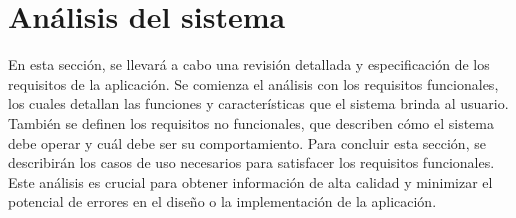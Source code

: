 \chapter{Análisis del sistema}
En esta sección, se llevará a cabo una revisión detallada y especificación de los requisitos de la aplicación. Se comienza el análisis con los requisitos funcionales, los cuales detallan las funciones y características que el sistema brinda al usuario. También se definen los requisitos no funcionales, que describen cómo el sistema debe operar y cuál debe ser su comportamiento. Para concluir esta sección, se describirán los casos de uso necesarios para satisfacer los requisitos funcionales. Este análisis es crucial para obtener información de alta calidad y minimizar el potencial de errores en el diseño o la implementación de la aplicación.




